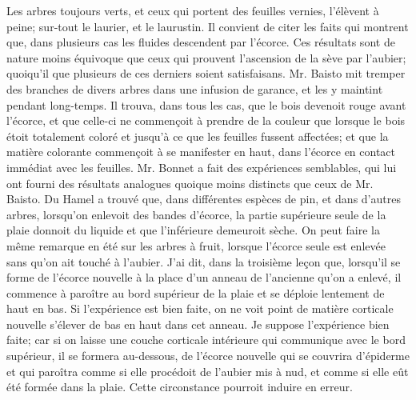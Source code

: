 Les arbres toujours verts, et ceux qui portent des feuilles vernies, l'élèvent à peine; sur-tout le laurier, et le laurustin.
Il convient de citer les faits qui montrent que, dans plusieurs cas les fluides descendent par l'écorce. Ces résultats sont de nature moins équivoque que ceux qui prouvent l'ascension de la sève par l'aubier; quoiqu'il que plusieurs de ces derniers soient satisfaisans.\setcounter{page}{94} Mr. Baisto mit tremper des branches de divers arbres dans une infusion de garance, et les y maintint pendant long-temps. Il trouva, dans tous les cas, que le bois devenoit rouge avant l'écorce, et que celle-ci ne commençoit à prendre de la couleur que lorsque le bois étoit totalement coloré et jusqu'à ce que les feuilles fussent affectées; et que la matière colorante commençoit à se manifester en haut, dans l'écorce en contact immédiat avec les feuilles.
Mr. Bonnet a fait des expériences semblables, qui lui ont fourni des résultats analogues quoique moins distincts que ceux de Mr. Baisto.
Du Hamel a trouvé que, dans différentes espèces de pin, et dans d'autres arbres, lorsqu'on enlevoit des bandes d'écorce, la partie supérieure seule de la plaie donnoit du liquide et que l'inférieure demeuroit sèche.
On peut faire la même remarque en été sur les arbres à fruit, lorsque l'écorce seule est enlevée sans qu'on ait touché à l'aubier.
J'ai dit, dans la troisième leçon que, lorsqu'il se forme de l'écorce nouvelle à la place d'un anneau de l'ancienne qu'on a enlevé, il commence à paroître au bord supérieur de la plaie et se déploie lentement de haut en bas. Si l'expérience est bien faite, on ne\setcounter{page}{95} voit point de matière corticale nouvelle s'élever de bas en haut dans cet anneau. Je suppose l'expérience bien faite; car si on laisse une couche corticale intérieure qui communique avec le bord supérieur, il se formera au-dessous, de l'écorce nouvelle qui se couvrira d'épiderme et qui paroîtra comme si elle procédoit de l'aubier mis à nud, et comme si elle eût été formée dans la plaie. Cette circonstance pourroit induire en erreur.
